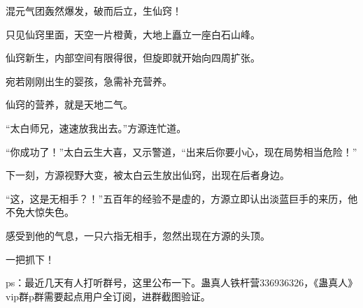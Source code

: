 \begin{this_body}
混元气团轰然爆发，破而后立，生仙窍！

只见仙窍里面，天空一片橙黄，大地上矗立一座白石山峰。

仙窍新生，内部空间有限得很，但旋即就开始向四周扩张。

宛若刚刚出生的婴孩，急需补充营养。

仙窍的营养，就是天地二气。

“太白师兄，速速放我出去。”方源连忙道。

“你成功了！”太白云生大喜，又示警道，“出来后你要小心，现在局势相当危险！”

下一刻，方源视野大变，被太白云生放出仙窍，出现在后者身边。

“这，这是无相手？！”五百年的经验不是虚的，方源立即认出淡蓝巨手的来历，他不免大惊失色。

感受到他的气息，一只六指无相手，忽然出现在方源的头顶。

一把抓下！

ps：最近几天有人打听群号，这里公布一下。蛊真人铁杆营336936326，《蛊真人》vip群p群需要起点用户全订阅，进群截图验证。

\end{this_body}

